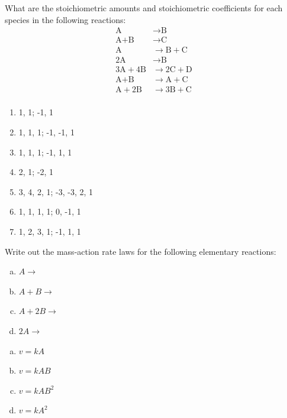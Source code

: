 \documentclass[12pt]{article}
\begin{document}
\begin{question}
What are the stoichiometric amounts and stoichiometric coefficients for each species in the following reactions:
%
\begin{align*}
 \text{A} &\longrightarrow \text{B} \\
 \text{A} + \text{B} &\longrightarrow \text{C} \\
 \text{A} &\longrightarrow \text{B} + \text{C} \\
 2 \text{A} &\longrightarrow \text{B} \\
 3 \text{A} + 4 \text{B} &\longrightarrow 2 \text{C} + \text{D} \\
 \text{A} + \text{B} &\longrightarrow \text{A} + \text{C} \\
 \text{A} + 2 \text{B} &\longrightarrow 3 \text{B} + \text{C} \\
\end{align*}
\end{question}
\begin{solution}
\begin{enumerate}
  \item 1, 1; -1, 1
  \item 1, 1, 1; -1, -1, 1
  \item 1, 1, 1; -1, 1, 1
  \item 2, 1; -2, 1
  \item 3, 4, 2, 1; -3, -3, 2, 1
  \item 1, 1, 1, 1; 0, -1, 1
  \item 1, 2, 3, 1; -1, 1, 1
\end{enumerate}
\end{solution}

\begin{question}
Write out the mass-action rate laws for the following elementary reactions:
\begin{enumerate}[a)]
  \item $ A \rightarrow $
  \item $ A + B \rightarrow $
  \item $A + 2 B \rightarrow $
  \item $2 A \rightarrow $
\end{enumerate}
\end{question}
\begin{solution}
\begin{enumerate}[a)]
  \item $ v = k A $
  \item $ v = k A B $
  \item $v = k A B^2 $
  \item $v = k A^2 $
\end{enumerate}
\end{solution}
\end{document}

